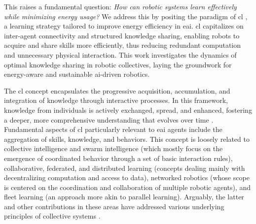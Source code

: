 \documentclass[12pt]{article}
\renewcommand{\emph}[1]{\textit{#1}}
\begin{document}
This raises a fundamental question: \emph{How can robotic systems learn effectively while minimizing energy usage?} We address this by positing the paradigm of \acl{cl} \cite{Haddadin2014SystemzumErstellen,Haddadin2015Systemgeneratingsets}, a learning strategy tailored to improve energy efficiency in \ac{eai}. \Ac{cl} capitalizes on inter-agent connectivity and structured knowledge sharing, enabling robots to acquire and share skills more efficiently, thus reducing redundant computation and unnecessary physical interaction. This work investigates the dynamics of optimal knowledge sharing in robotic collectives, laying the groundwork for energy-aware and sustainable \ac{ai}-driven robotics.

The \ac{cl} concept encapsulates the progressive acquisition, accumulation, and integration of knowledge through interactive processes. In this framework, knowledge from individuals is actively exchanged, spread, and enhanced, fostering a deeper, more comprehensive understanding that evolves over time \cite{Garavan2012CollectiveLearning}.  Fundamental aspects of \ac{cl} particularly relevant to \ac{eai} agents include the aggregation of skills, knowledge, and behaviors. This concept is loosely related to collective intelligence and swarm intelligence \cite{Beni2004SwarmIntelligenceSwarm,Blum2015SwarmIntelligenceOptimization,Dorigo2021SwarmRoboticsPast} (which mostly focus on the emergence of coordinated behavior through a set of basic interaction rules), collaborative, federated, and distributed learning \cite{Technologie2023FLAIROPFederatedLearning,Anjos2023SurveyCollaborativeLearning,Xianjia2021Federatedlearningrobotic,Sartoretti2019DistributedLearningDecentralized,Sartoretti2018DistributedLearningDecentralized,Wang2022DistributedReinforcementLearning} (concepts dealing mainly with decentralizing computation and access to data), networked robotics \cite{Kumar2008NetworkedRobots} (whose scope is centered on the coordination and collaboration of multiple robotic agents), and fleet learning \cite{Wang2023RobotFleetLearning} (an approach more akin to parallel learning). Arguably, the latter and other contributions in these areas have addressed various underlying principles of collective systems \cite{Kernbach2013HandbookCollectiveRobotics}.
\end{document}
